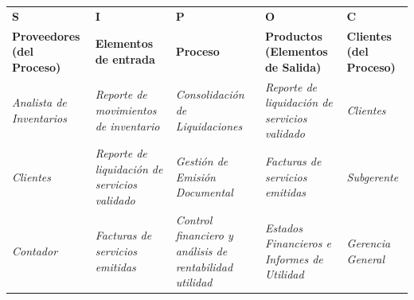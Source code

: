 \documentclass[11pt,letterpaper]{report}
\begin{document}
\begin{center}
  \small
  \begin{tabularx}{\textwidth}{>{\centering\arraybackslash}X >{\centering\arraybackslash}X >{\centering\arraybackslash}X >{\centering\arraybackslash}X >{\centering\arraybackslash}X}
  \toprule
  \textbf{S} & \textbf{I} & \textbf{P} & \textbf{O} & \textbf{C} \\
  \textbf{Proveedores (del Proceso)} & \textbf{Elementos de entrada} & \textbf{Proceso} & \textbf{Productos (Elementos de Salida)} & \textbf{Clientes (del Proceso)} \\
  \midrule
  \textit{Analista de Inventarios} & \textit{Reporte de movimientos de inventario} & \textit{Consolidación de Liquidaciones} & \textit{Reporte de liquidación de servicios validado} & \textit{Clientes} \\
  \midrule
  \textit{Clientes} & \textit{Reporte de liquidación de servicios validado} & \textit{Gestión de Emisión Documental} & \textit{Facturas de servicios emitidas} & \textit{Subgerente} \\
  \midrule
  \textit{Contador} & \textit{Facturas de servicios emitidas} & \textit{Control financiero y análisis de rentabilidad utilidad} & \textit{Estados Financieros e Informes de Utilidad} & \textit{Gerencia General} \\
  \bottomrule
  \end{tabularx}
\end{center}

\vspace{7em}
\end{document}

